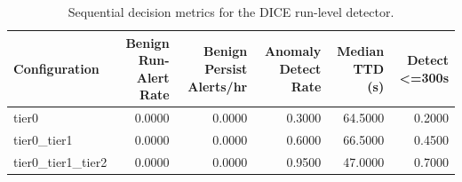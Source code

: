 \begin{table}[t]
\centering
\caption{Sequential decision metrics for the DICE run-level detector.}
\label{tab:dice_sequential_metrics}
\footnotesize
\begin{tabular}{lrrrrr}
\toprule
Configuration & Benign Run-Alert Rate & Benign Persist Alerts/hr & Anomaly Detect Rate & Median TTD (s) & Detect <=300s \\
\midrule
tier0 & 0.0000 & 0.0000 & 0.3000 & 64.5000 & 0.2000 \\
tier0_tier1 & 0.0000 & 0.0000 & 0.6000 & 66.5000 & 0.4500 \\
tier0_tier1_tier2 & 0.0000 & 0.0000 & 0.9500 & 47.0000 & 0.7000 \\
\bottomrule
\end{tabular}

\end{table}
